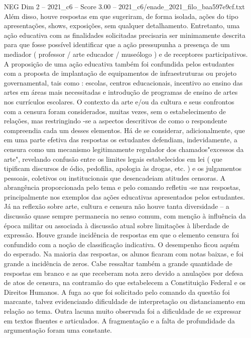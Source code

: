 \begin{textsample}{NEG Dim 2 – 2021\_c6 – Score 3.00 – 2021\_c6/enade\_2021\_filo\_baa597e9cf.txt}
Além disso, houve respostas em que sugeriram, de forma isolada, ações do tipo apresentações, shows, exposições, sem qualquer detalhamento.
Entretanto, uma ação educativa com as finalidades solicitadas precisaria ser minimamente descrita para que fosse possível identificar que a ação pressupunha a presença de um mediador ( professor / arte educador / museólogo ) e de receptores participativos.
A proposição de uma ação educativa também foi confundida pelos estudantes com a proposta de implantação de equipamentos de infraestruturas ou projeto governamental, tais como : escolas, centros educacionais, incentivo ao ensino das artes em áreas mais necessitadas e introdução de programas de ensino de artes nos currículos escolares.
O contexto da arte e/ou da cultura e seus confrontos com a censura foram considerados, muitas vezes, sem o estabelecimento de relações, mas restringindo -se a aspectos descritivos de como o respondente compreendia cada um desses elementos.
Há de se considerar, adicionalmente, que em uma parte efetiva das respostas os estudantes defendiam, indevidamente, a censura como um mecanismo legitimamente regulador dos chamados"excessos da arte", revelando confusão entre os limites legais estabelecidos em lei ( que tipificam discursos de ódio, pedofilia, apologia às drogas, etc. ) e os julgamentos pessoais, coletivos ou institucionais que desencadeiam atitudes censoras.
A abrangência proporcionada pelo tema e pelo comando refletiu -se nas respostas, principalmente nos exemplos das ações educativas apresentados pelos estudantes.
Já na reflexão sobre arte, cultura e censura não houve tanta diversidade – a discussão quase sempre permanecia no senso comum, com menção à influência da época militar ou associada à discussão atual sobre limitações à liberdade de expressão.
Houve grande incidência de respostas em que o elemento censura foi confundido com a noção de classificação indicativa.
O desempenho ficou aquém do esperado.
Na maioria das respostas, os alunos ficaram com notas baixas, e foi grande a incidência de zeros.
Cabe ressaltar também a grande quantidade de respostas em branco e as que receberam nota zero devido a anulações por defesa de atos de censura, na contramão do que estabelecem a Constituição Federal e os Direitos Humanos.
A fuga ao que foi solicitado pelo comando da questão foi marcante, talvez evidenciando dificuldade de interpretação ou distanciamento em relação ao tema.
Outra lacuna muito observada foi a dificuldade de se expressar em textos fluentes e articulados.
A fragmentação e a falta de profundidade da argumentação foram uma constante.

\end{textsample}
